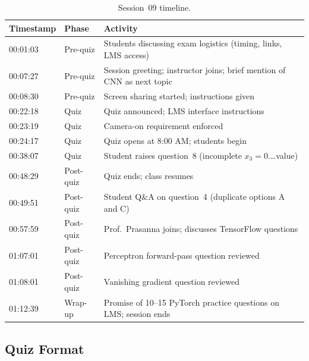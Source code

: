 \documentclass[12pt,a4paper]{article}
\begin{document}
\begin{table}[htbp]
  \centering
  \caption{Session~09 timeline.}
  \label{tab:timeline}
  \begin{tabularx}{\linewidth}{llX}
    \toprule
    \textbf{Timestamp} & \textbf{Phase} & \textbf{Activity} \\
    \midrule
    00:01:03 & Pre-quiz   & Students discussing exam logistics
                            (timing, links, LMS access) \\
    00:07:27 & Pre-quiz   & Session greeting; instructor joins; brief
                            mention of CNN as next topic \\
    00:08:30 & Pre-quiz   & Screen sharing started; instructions given \\
    00:22:18 & Quiz       & Quiz announced; LMS interface instructions \\
    00:23:19 & Quiz       & Camera-on requirement enforced \\
    00:24:17 & Quiz       & Quiz opens at 8:00 AM; students begin \\
    00:38:07 & Quiz       & Student raises question~8 (incomplete
                            $x_3 = 0.\!$\ldots value) \\
    00:48:29 & Post-quiz  & Quiz ends; class resumes \\
    00:49:51 & Post-quiz  & Student Q\&A on question~4 (duplicate
                            options A and C) \\
    00:57:59 & Post-quiz  & Prof.\ Prasanna joins; discusses TensorFlow
                            questions \\
    01:07:01 & Post-quiz  & Perceptron forward-pass question reviewed \\
    01:08:01 & Post-quiz  & Vanishing gradient question reviewed \\
    01:12:39 & Wrap-up    & Promise of 10--15 PyTorch practice questions
                            on LMS; session ends \\
    \bottomrule
  \end{tabularx}
\end{table}

\subsection{Quiz Format}
\label{ssec:quiz_format}
\end{document}
